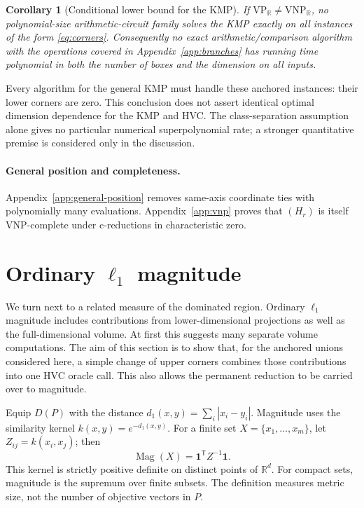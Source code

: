 \documentclass[12pt,a4paper]{article}
\newtheorem{corollary}[theorem]{Corollary}
\theoremstyle{definition}
\theoremstyle{remark}
\newcommand{\R}{\mathbb R}
\newcommand{\Mag}{\operatorname{Mag}}
\newcommand{\VP}{\mathrm{VP}}
\newcommand{\VNP}{\mathrm{VNP}}
\newcommand{\one}{\mathbf 1}
\begin{document}
\begin{corollary}[Conditional lower bound for the KMP]
\label{cor:klee}
If $\VP_{\R}\ne\VNP_{\R}$, no polynomial-size arithmetic-circuit
family solves the KMP exactly on all instances of the form
\eqref{eq:corners}. Consequently no exact arithmetic/comparison
algorithm with the operations covered in Appendix~\ref{app:branches}
has running time polynomial in both the number of boxes and the
dimension on all inputs.
\end{corollary}

Every algorithm for the general KMP must handle these anchored
instances: their lower corners are zero. This conclusion does not
assert identical optimal dimension dependence for the KMP and HVC.
The class-separation assumption alone gives
no particular numerical superpolynomial rate; a stronger quantitative
premise is considered only in the discussion.

\paragraph{General position and completeness.}
Appendix~\ref{app:general-position} removes same-axis coordinate ties
with polynomially many evaluations. Appendix~\ref{app:vnp} proves that
$(H_r)$ is itself $\VNP$-complete under c-reductions in characteristic
zero.

\section{Ordinary \texorpdfstring{$\ell_1$}{l1} magnitude}
\label{sec:magnitude}

We turn next to a related measure of the dominated region. Ordinary
$\ell_1$ magnitude includes contributions from lower-dimensional
projections as well as the full-dimensional volume. At first this
suggests many separate volume computations. The aim of this section
is to show that, for the anchored unions considered here, a simple
change of upper corners combines those contributions into one
HVC oracle call. This also allows the permanent reduction to
be carried over to magnitude.

Equip $D(P)$ with the distance
$d_1(x,y)=\sum_i|x_i-y_i|$. Magnitude uses the similarity kernel
$k(x,y)=e^{-d_1(x,y)}$. For a finite set $X=\{x_1,\ldots,x_m\}$,
let $Z_{ij}=k(x_i,x_j)$; then
\[
 \Mag(X)=\one^{\mathsf T}Z^{-1}\one.
\]
This kernel is strictly positive definite on distinct points of
$\R^d$. For compact sets, magnitude is the supremum over finite
subsets. The definition measures metric size, not the number of
objective vectors in $P$.
\end{document}
